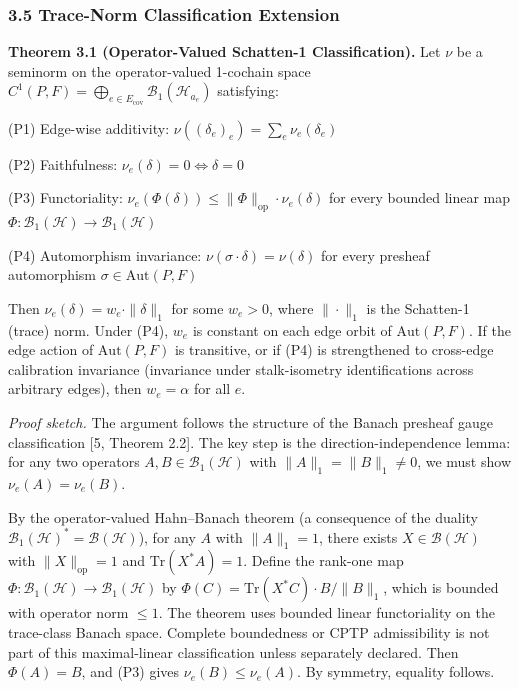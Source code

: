 \documentclass[
]{article}
\renewenvironment{quote}
  {\begin{leftbar}\small}
  {\end{leftbar}}
\begin{document}
\subsubsection{3.5 Trace-Norm Classification Extension}\label{trace-norm-classification-extension}

\begin{quote}
\textbf{Theorem 3.1 (Operator-Valued Schatten-1 Classification).} Let \(\nu\) be a seminorm on the operator-valued 1-cochain space \(C^1(P, F) = \bigoplus_{e \in E_{\mathrm{cov}}} \mathcal{B}_1(\mathcal{H}_{a_e})\) satisfying:

(P1) Edge-wise additivity: \(\nu((\delta_e)_e) = \sum_e \nu_e(\delta_e)\)

(P2) Faithfulness: \(\nu_e(\delta) = 0 \iff \delta = 0\)

(P3) Functoriality: \(\nu_e(\Phi(\delta)) \leq \|\Phi\|_{\mathrm{op}} \cdot \nu_e(\delta)\) for every bounded linear map \(\Phi: \mathcal{B}_1(\mathcal{H}) \to \mathcal{B}_1(\mathcal{H})\)

(P4) Automorphism invariance: \(\nu(\sigma \cdot \delta) = \nu(\delta)\) for every presheaf automorphism \(\sigma \in \mathrm{Aut}(P, F)\)

Then \(\nu_e(\delta) = w_e \cdot \|\delta\|_1\) for some \(w_e > 0\), where \(\|\cdot\|_1\) is the Schatten-1 (trace) norm. Under (P4), \(w_e\) is constant on each edge orbit of \(\mathrm{Aut}(P, F)\). If the edge action of \(\mathrm{Aut}(P, F)\) is transitive, or if (P4) is strengthened to cross-edge calibration invariance (invariance under stalk-isometry identifications across arbitrary edges), then \(w_e = \alpha\) for all \(e\).
\end{quote}

\emph{Proof sketch.} The argument follows the structure of the Banach presheaf gauge classification {[}5, Theorem 2.2{]}. The key step is the direction-independence lemma: for any two operators \(A, B \in \mathcal{B}_1(\mathcal{H})\) with \(\|A\|_1 = \|B\|_1 \neq 0\), we must show \(\nu_e(A) = \nu_e(B)\).

By the operator-valued Hahn--Banach theorem (a consequence of the duality \(\mathcal{B}_1(\mathcal{H})^* = \mathcal{B}(\mathcal{H})\)), for any \(A\) with \(\|A\|_1 = 1\), there exists \(X \in \mathcal{B}(\mathcal{H})\) with \(\|X\|_{\mathrm{op}} = 1\) and \(\mathrm{Tr}(X^* A) = 1\). Define the rank-one map \(\Phi: \mathcal{B}_1(\mathcal{H}) \to \mathcal{B}_1(\mathcal{H})\) by \(\Phi(C) = \mathrm{Tr}(X^* C) \cdot B / \|B\|_1\), which is bounded with operator norm \(\leq 1\). The theorem uses bounded linear functoriality on the trace-class Banach space. Complete boundedness or CPTP admissibility is not part of this maximal-linear classification unless separately declared. Then \(\Phi(A) = B\), and (P3) gives \(\nu_e(B) \leq \nu_e(A)\). By symmetry, equality follows.
\end{document}
